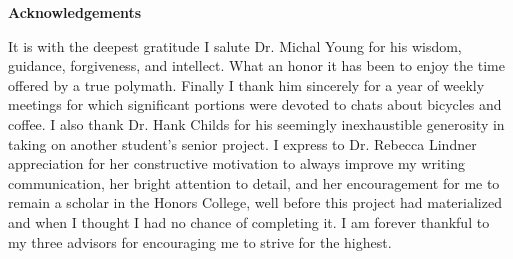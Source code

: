 \newpage
\thispagestyle{plain}
\begin{center}

\normalsize \textbf {Acknowledgements}
\end{center}


It is with the deepest gratitude I salute Dr. Michal Young for his wisdom, guidance, forgiveness, and intellect. What an honor it has been to enjoy the time offered by a true polymath. Finally I thank him sincerely for a year of weekly meetings for which significant portions were devoted to chats about bicycles and coffee. I also thank Dr. Hank Childs for his seemingly inexhaustible generosity in taking on another student's senior project. I express to Dr. Rebecca Lindner appreciation for her constructive motivation to always improve my writing communication, her bright attention to detail, and her encouragement for me to remain a scholar in the Honors College, well before this project had materialized and when I thought I had no chance of completing it. I am forever thankful to my three advisors for encouraging me to strive for the highest.

\newpage